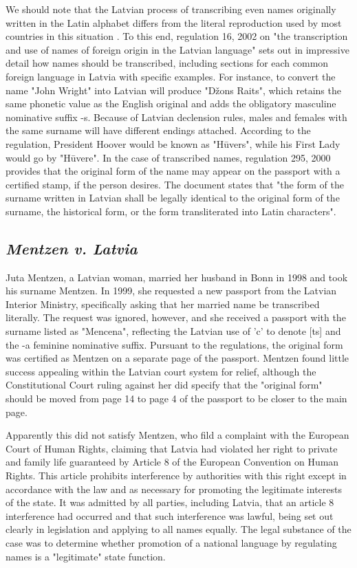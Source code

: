 We should note that the Latvian process of transcribing even names originally written in the Latin alphabet differs from the literal reproduction used by most countries in this situation \parencite{}. To this end, regulation 16, 2002 on "the transcription and use of names of foreign origin in the Latvian language" sets out in impressive detail how names should be transcribed, including sections for each common foreign language in Latvia with specific examples. For instance, to convert the name "John Wright" into Latvian will produce "Džons Raits", which retains the same phonetic value as the English original and adds the obligatory masculine nominative suffix -s. Because of Latvian declension rules, males and females with the same surname will have different endings attached. According to the regulation, President Hoover would be known as "Hūvers", while his First Lady would go by "Hūvere". In the case of transcribed names, regulation 295, 2000 provides that the original form of the name may appear on the passport with a certified stamp, if the person desires. The document states that "the form of the surname written in Latvian shall be legally identical to the original form of the surname, the historical form, or the form transliterated into Latin characters".

\subsection{\textit{Mentzen v. Latvia}}

Juta Mentzen, a Latvian woman, married her husband in Bonn in 1998 and took his surname Mentzen. In 1999, she requested a new passport from the Latvian Interior Ministry, specifically asking that her married name be transcribed literally. The request was ignored, however, and she received a passport with the surname listed as "Mencena", reflecting the Latvian use of 'c' to denote [ts] and the -a feminine nominative suffix. Pursuant to the regulations, the original form was certified as Mentzen on a separate page of the passport. Mentzen found little success appealing within the Latvian court system for relief, although the Constitutional Court ruling against her did specify that the "original form" should be moved from page 14 to page 4 of the passport to be closer to the main page.

Apparently this did not satisfy Mentzen, who fild a complaint with the European Court of Human Rights, claiming that Latvia had violated her right to private and family life guaranteed by Article 8 of the European Convention on Human Rights. This article prohibits interference by authorities with this right except in accordance with the law and as necessary for promoting the legitimate interests of the state. It was admitted by all parties, including Latvia, that an article 8 interference had occurred and that such interference was lawful, being set out clearly in legislation and applying to all names equally. The legal substance of the case was to determine whether promotion of a national language by regulating names is a "legitimate" state function.


